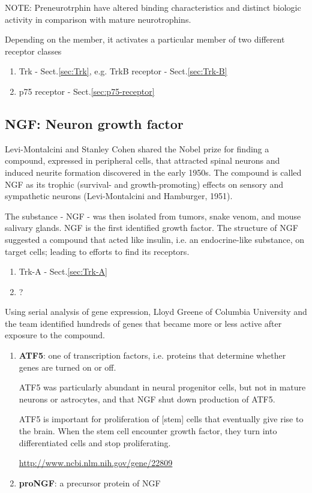 NOTE: Preneurotrphin have altered binding characteristics and distinct biologic
activity in comparison with mature neurotrophins.

Depending on the member, it activates a particular member of two different
receptor classes
\begin{enumerate}
  \item Trk - Sect.\ref{sec:Trk}, e.g. TrkB receptor - Sect.\ref{sec:Trk-B}
  
  \item p75 receptor - Sect.\ref{sec:p75-receptor}
\end{enumerate}

\subsection{NGF: Neuron growth factor}
\label{sec:NGF}

Levi-Montalcini and  Stanley Cohen shared the Nobel prize for finding a
compound, expressed in peripheral cells, that attracted spinal neurons and
induced neurite formation discovered in the early 1950s.
The compound is called NGF as its trophic (survival- and growth-promoting)
effects on sensory and sympathetic neurons (Levi-Montalcini and Hamburger,
1951). 

The substance - NGF - was then isolated from tumors, snake venom, and
mouse salivary glands. NGF is the first identified growth factor.
The structure of NGF suggested a compound that acted like insulin, i.e. 
an endocrine-like substance, on target cells; leading to efforts to find its
receptors.
\begin{enumerate}
  \item Trk-A - Sect.\ref{sec:Trk-A}
  
  \item ?
\end{enumerate}

Using serial analysis of gene expression, Lloyd Greene of Columbia University
and the team identified hundreds of genes that became more or less active after
exposure to the compound.
\begin{enumerate}
  \item  {\bf ATF5}: one of transcription factors, i.e. proteins that determine
  whether genes are turned on or off. 
  
  ATF5 was particularly abundant in neural progenitor cells, but not in mature
  neurons or astrocytes, and that NGF shut down production of ATF5.
  
  ATF5 is important for proliferation of [stem] cells that eventually give rise
  to the brain. When the stem cell encounter growth factor, they turn into
  differentiated cells and stop proliferating.
  
  \url{http://www.ncbi.nlm.nih.gov/gene/22809}
  
  \item {\bf proNGF}: a precursor protein of NGF
  
  
  
\end{enumerate}

